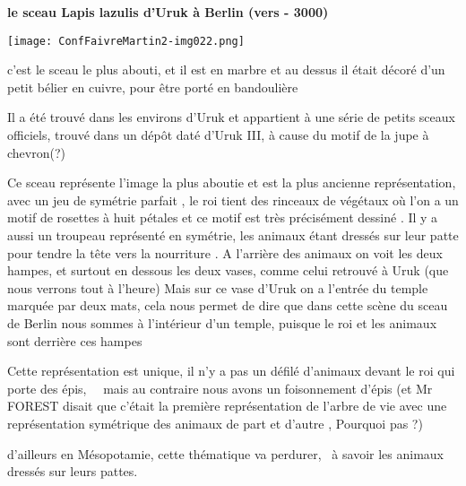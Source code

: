 \documentclass[a4paper]{article}
\begin{document}
\bigskip


\bigskip


\bigskip


\bigskip


\bigskip


\bigskip


\bigskip


\bigskip

{
\textbf{le sceau Lapis lazulis d'Uruk à Berlin (vers - 3000)}}


\bigskip

 \texttt{[image: ConfFaivreMartin2-img022.png]} 


\bigskip

{
c'est le sceau le plus abouti, et il est en marbre et au dessus il était décoré d'un petit bélier en cuivre, pour être
porté en bandoulière}

{
Il a été trouvé dans les environs d'Uruk et appartient à une série de petits sceaux officiels, trouvé dans un dépôt daté
d'Uruk III, à cause du motif de la jupe à chevron(?)}


\bigskip


\bigskip

{
Ce sceau représente l'image la plus aboutie et est la plus ancienne représentation, avec un jeu de symétrie parfait , le
roi tient des rinceaux de végétaux où l'on a un motif de rosettes à huit pétales et ce motif est très précisément
dessiné . Il y a aussi un troupeau représenté en symétrie, les animaux étant dressés sur leur patte pour tendre la tête
vers la nourriture . A l'arrière des animaux on voit les deux hampes, et surtout en dessous les deux vases, comme celui
retrouvé à Uruk (que nous verrons tout à l'heure) Mais sur ce vase d'Uruk on a l'entrée du temple marquée par deux
mats, cela nous permet de dire que dans cette scène du sceau de Berlin nous sommes à l'intérieur d'un temple, puisque
le roi et les animaux sont derrière ces hampes}


\bigskip

{
Cette représentation est unique, il n'y a pas un défilé d'animaux devant le roi qui porte des épis, \ \ mais au
contraire nous avons un foisonnement d'épis (et Mr FOREST disait que c'était la première représentation de l'arbre de
vie avec une représentation symétrique des animaux de part et d'autre , Pourquoi pas ?)}

{
d'ailleurs en Mésopotamie, cette thématique va perdurer, \ à savoir les animaux dressés sur leurs pattes.}
\end{document}
